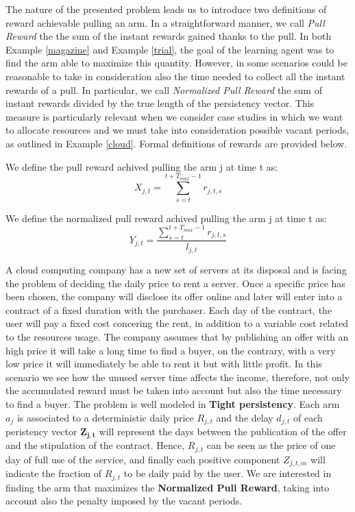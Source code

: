 The nature of the presented problem leads us to introduce two definitions of reward achievable pulling an arm. In a straightforward manner, we call \emph{Pull Reward} the the sum of the instant rewards gained thanks to the pull. In both Example \ref{magazine} and Example \ref{trial}, the goal of the learning agent was to find the arm able to maximize this quantity. However, in some scenarios could be reasonable to take in consideration also the time needed to collect all the instant rewards of a pull. In particular, we call \emph{Normalized Pull Reward} the sum of instant rewards divided by the true length of the persistency vector.
This measure is particularly relevant when we consider case studies in which we want to allocate resources and we must take into consideration possible vacant periods, as outlined in Example \ref{cloud}.
Formal definitions of rewards are provided below.


\begin{definition}
	We define the pull reward achived pulling the arm j at time t as:
		$$X_{j,t} = \sum_{s=t}^{t+T_{max}-1} r_{j,t,s}$$
\end{definition}

\begin{definition}
	We define the normalized pull reward achived pulling the arm j at time t as:
		$$Y_{j,t} = \dfrac{\sum_{s=t}^{t+T_{max}-1} r_{j,t,s}}{l_{j,t}}$$
\end{definition}
\begin{example}
\label{cloud}
A cloud computing company has a new set of servers at its disposal and is facing the problem of deciding the daily price to rent a server. Once a specific price has been chosen, the company will disclose its offer online and later will enter into a contract of a fixed duration with the purchaser. Each day of the contract, the user will pay a fixed cost concering the rent, in addition to a variable cost related to the resources usage. The company assumes that by publishing an offer with an high price it will take a long time to find a buyer, on the contrary, with a very low price it will immediately be able to rent it but with little profit. In this scenario we see how the unused server time affects the income, therefore, not only the accumulated reward must be taken into account but also the time necessary to find a buyer. The problem is well modeled in 	\textbf{Tight persistency}. Each arm $a_j$ is associated to a deterministic daily price $R_{j,t}$ and the delay $d_{j,t}$ of each peristency vector $\boldsymbol{Z_{j,t}}$ will represent the days between the publication of the offer and the stipulation of the contract. Hence, $R_{j,t}$ can be seen as the price of one day of full use of the service, and finally each positive component $Z_{j,t,m}$ will indicate the fraction of $R_{j,t}$ to be daily paid by the user. We are interested in finding the arm that maximizes the \textbf{Normalized Pull Reward}, taking into account also the penalty imposed by the vacant periods.

\end{example}

